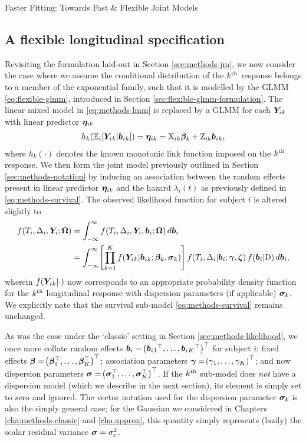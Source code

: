 \begin{chapter}{\label{cha:flexible}Faster Fitting: Towards Fast \& Flexible Joint Models}
\subsection{A flexible longitudinal specification}\label{sec:flexible-gmvjm-formulation}
Revisiting the formulation laid-out in Section \ref{sec:methods-jm}, we now consider the case where we assume the conditional distribution of the $k^{\text{th}}$ response belongs to a member of the exponential family, such that it is modelled by the GLMM \eqref{eq:flexible-glmm}, introduced in Section \ref{sec:flexible-glmm-formulation}. The linear mixed model in \eqref{eq:methods-lmm} is replaced by a GLMM for each $\bm{Y}_i{_k}$ with linear predictor $\bm{\eta}_{ik}$
\begin{align}
    h_k\!\left( \mathbb{E}_i\!\left[\bm{Y}_i{_k}|\bm{b}_i{_k}\right]\right)=\bm{\eta}_{ik}=\mathrm{X}_{ik}\bm{\beta}_k+\mathrm{Z}_{ik}\bm{b}_i{_k},
\label{eq:flexible-jm-glmm}
\end{align}
where $h_k(\cdot)$ denotes the known monotonic link function imposed on the $k^{\text{th}}$ response. We then form the joint model previously outlined in Section \ref{sec:methods-notation} by inducing an association between the random effects present in linear predictor $\bm{\eta}_{ik}$ and the hazard $\lambda_i(t)$ as previously defined in \eqref{eq:methods-survival}. The observed likelihood function for subject $i$ is altered slightly to
\begin{align}
    f\!\left( T_i, \Delta_i, \bm{Y}_i; \bm{\mathrm{\Omega}}\right) &= \int_{-\infty}^\infty f\!\left( T_i, \Delta_i, \bm{Y}_i, \bm{b}_i; \bm{\mathrm{\Omega}}\right) d\bm{b}_i \nonumber \\
    &= \int_{-\infty}^\infty\!\left[\prod_{k=1}^K f\!\left(\bm{Y}_i{_k}|\bm{b}_i{_k};\bm{\beta}_k,\bm{\sigma}_k\right)\right] f\!\left( T_i,\Delta_i|\bm{b}_i;\bm{\gamma},\bm{\zeta}\right) f\!\left(\bm{b}_i|\mathrm{D}\right) d\bm{b}_i,
    \label{eq:flexible-likelihood-glmm}
\end{align}
wherein $f\!\left(\bm{Y}_i{_k}|\cdot\right)$ now corresponds to an appropriate probability density function for the $k^{\text{th}}$ longitudinal response with dispersion parameters (if applicable) $\bm{\sigma}_k$. We explicitly note that the survival sub-model \eqref{eq:methods-survival} remains unchanged. 

As was the case under the `classic' setting in Section \ref{sec:methods-likelihood}, we once more collate random effects $\bm{b}_i=\!\left(\bm{b}_i{_1}^\top,\dots,\bm{b}_i{_K}^\top\right)^\top$ for subject $i$; fixed effects $\bm{\beta}=\!\left(\bm{\beta}_1^\top,\dots,\bm{\beta}_K^\top\right)^\top$; association parameters $\bm{\gamma}=\!\left(\gamma_1,\dots,\gamma_K\right)^\top$; and now dispersion parameters $\bm{\sigma}=\!\left(\bm{\sigma}_1^\top,\dots,\bm{\sigma}_K^\top\right)^\top$. If the $k^{\text{th}}$ sub-model does \textit{not} have a dispersion model (which we describe in the next section), its element is simply set to zero and ignored. The vector notation used for the dispersion parameter $\bm{\sigma}_k$ is also the simply general case; for \eg the Gaussian we considered in Chapters \ref{cha:methods-classic} and \ref{cha:approx}, this quantity simply represents (lazily) the scalar residual variance $\bm{\sigma}=\sigma_\varepsilon^2$.


\end{chapter}
